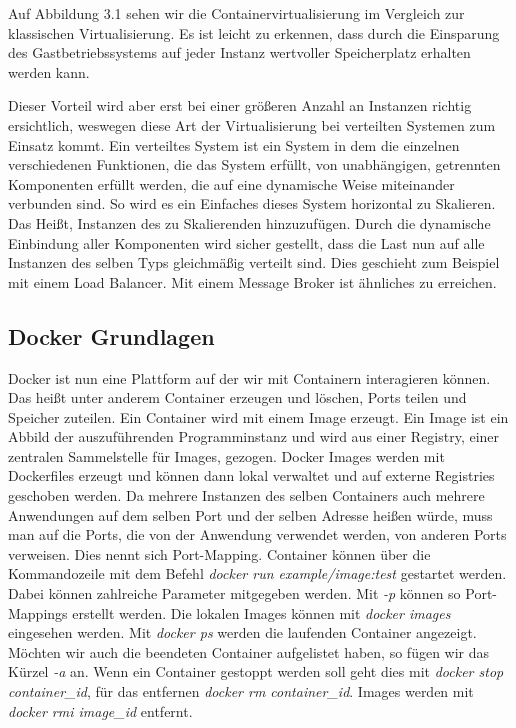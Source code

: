 \documentclass[12pt,a4paper]{scrartcl}
\begin{document}
Auf Abbildung 3.1 sehen wir die Containervirtualisierung im Vergleich zur klassischen Virtualisierung. Es ist leicht zu erkennen, dass durch die Einsparung des Gastbetriebssystems auf jeder Instanz wertvoller Speicherplatz erhalten werden kann. 

Dieser Vorteil wird aber erst bei einer größeren Anzahl an Instanzen richtig ersichtlich, weswegen diese Art der Virtualisierung bei verteilten Systemen zum Einsatz kommt. Ein verteiltes System ist ein System in dem die einzelnen verschiedenen Funktionen, die das System erfüllt, von unabhängigen, getrennten Komponenten erfüllt werden, die auf eine dynamische Weise miteinander verbunden sind. So wird es ein Einfaches dieses System horizontal zu Skalieren. Das Heißt, Instanzen des zu Skalierenden hinzuzufügen. Durch die dynamische Einbindung aller Komponenten wird sicher gestellt, dass die Last nun auf alle Instanzen des selben Typs gleichmäßig verteilt sind. Dies geschieht zum Beispiel mit einem Load Balancer. Mit einem Message Broker ist ähnliches zu erreichen.

\subsection{Docker Grundlagen}

Docker ist nun eine Plattform auf der wir mit Containern interagieren können. Das heißt unter anderem Container erzeugen und löschen, Ports teilen und Speicher zuteilen. Ein Container wird mit einem Image erzeugt. Ein Image ist ein Abbild der auszuführenden Programminstanz und wird aus einer Registry, einer zentralen Sammelstelle für Images, gezogen. Docker Images werden mit Dockerfiles erzeugt und können dann lokal verwaltet und auf externe Registries geschoben werden. Da mehrere Instanzen des selben Containers auch mehrere Anwendungen auf dem selben Port und der selben Adresse heißen würde, muss man auf die Ports, die von der Anwendung verwendet werden, von anderen Ports verweisen. Dies nennt sich Port-Mapping. Container können über die Kommandozeile mit dem Befehl  \emph{docker run example/image:test} gestartet werden. Dabei können zahlreiche Parameter mitgegeben werden. Mit \emph{-p} können so Port-Mappings erstellt werden. Die lokalen Images können mit \emph{docker images} eingesehen werden. Mit \emph{docker ps} werden die laufenden Container angezeigt. Möchten wir auch die beendeten Container aufgelistet haben, so fügen wir das Kürzel \emph{-a} an. Wenn ein Container gestoppt werden soll geht dies mit \emph{docker stop container\_id}, für das entfernen \emph{docker rm container\_id}. Images werden mit \emph{docker rmi image\_id} entfernt. 
\end{document}
